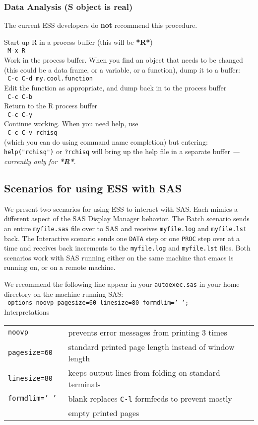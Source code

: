 \documentclass{article}
\newcommand{\elcode}[1]{\\{\tt\hspace*{2em} #1}\\}
\begin{document}
\subsubsection{Data Analysis (S object is real)}
The current ESS developers do {\bf not} recommend this procedure.

\noindent
Start up R in a process buffer (this will be \textbf{*R*}) 
  \elcode{M-x R}
Work in the process buffer.  When you find an object that needs
to be changed (this could be a data frame, or a variable,
or a function), dump it to a buffer:
  \elcode{C-c C-d my.cool.function}
Edit the function as appropriate, and dump back in to the
process buffer
  \elcode{C-c C-b}
Return to the R process buffer
  \elcode{C-c C-y}
Continue working.
When you need help, use
  \elcode{C-c C-v rchisq}
(which you can do using command name completion)
but entering:   {\tt help("rchisq")} or {\tt ?rchisq}
will bring up the help file in a separate buffer
\emph{--- currently only for \textbf{*R*}}.



\subsection{Scenarios for using ESS with SAS}
\label{sec:SAS:scen}

We present two scenarios for using ESS to interact with SAS.  Each mimics
a different aspect of the SAS Display Manager behavior.
The Batch scenario sends an entire {\tt myfile.sas} file over to
SAS and receives {\tt myfile.log} and {\tt myfile.lst} back.  The Interactive
scenario sends one {\tt DATA} step or one {\tt PROC} step over at a time
and receives back increments to the {\tt myfile.log} and {\tt myfile.lst} files.
Both scenarios work with SAS running either on the same machine that emacs
is running on, or on a remote machine.

We recommend the following line appear in
your {\tt autoexec.sas} in your home directory on the machine running SAS:
\elcode{options noovp pagesize=60 linesize=80 formdlim=' ';}
Interpretations\\
\begin{tabular}{ll}
\tt   noovp         & prevents error messages from printing 3 times         \\
\tt   pagesize=60   & standard printed page length instead of window length \\
\tt   linesize=80   & keeps output lines from folding on standard terminals \\
\tt   formdlim=' '  & blank replaces {\tt C-l} formfeeds to prevent mostly  \\
\tt 		    & empty printed pages                                   \\
\end{tabular}\\
\end{document}
